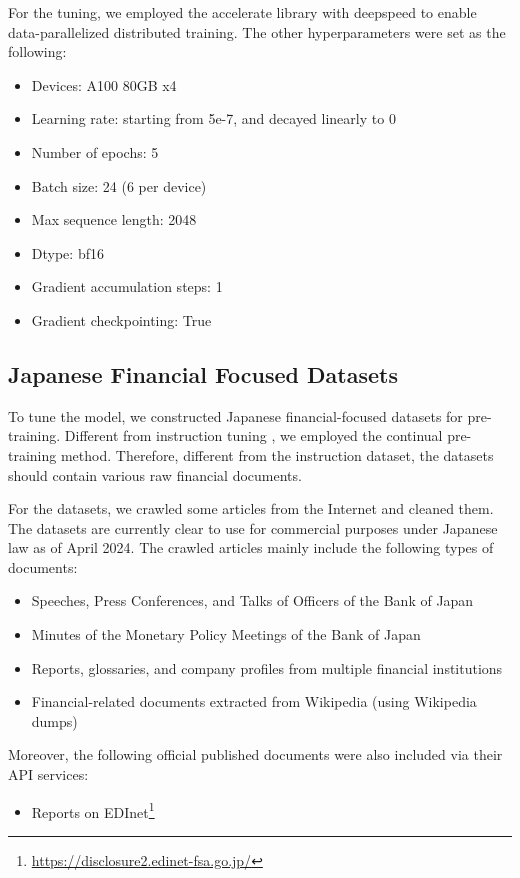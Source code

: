 For the tuning, we employed the accelerate library\cite{accelerate} with deepspeed \cite{rasley2020deepspeed} to enable data-parallelized distributed training.
The other hyperparameters were set as the following:
\begin{itemize}
    \item Devices: A100 80GB x4
    \item Learning rate: starting from 5e-7, and decayed linearly to 0
    \item Number of epochs: 5
    \item Batch size: 24 (6 per device)
    \item Max sequence length: 2048
    \item Dtype: bf16
    \item Gradient accumulation steps: 1
    \item Gradient checkpointing: True
\end{itemize}

\subsection{Japanese Financial Focused Datasets}
To tune the model, we constructed Japanese financial-focused datasets for pre-training.
Different from instruction tuning \cite{wei2021finetuned}, we employed the continual pre-training method.
Therefore, different from the instruction dataset, the datasets should contain various raw financial documents.

For the datasets, we crawled some articles from the Internet and cleaned them.
The datasets are currently clear to use for commercial purposes under Japanese law as of April 2024.
The crawled articles mainly include the following types of documents:
\begin{itemize}
    \item Speeches, Press Conferences, and Talks of Officers of the Bank of Japan
    \item Minutes of the Monetary Policy Meetings of the Bank of Japan
    \item Reports, glossaries, and company profiles from multiple financial institutions
    \item Financial-related documents extracted from Wikipedia (using Wikipedia dumps)
\end{itemize}

Moreover, the following official published documents were also included via their API services:
\begin{itemize}
    \item Reports on EDInet\footnote{\url{https://disclosure2.edinet-fsa.go.jp/}}
\end{itemize}

